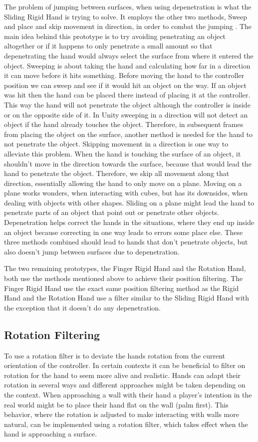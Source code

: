 The problem of jumping between surfaces, when using depenetration is what the Sliding Rigid Hand is trying to solve. It employs the other two methods, Sweep and place and skip movement in direction, in order to combat the jumping . The main idea behind this prototype is to try avoiding penetrating an object altogether or if it happens to only penetrate a small amount so that depenetrating the hand would always select the surface from where it entered the object. Sweeping is about taking the hand and calculating how far in a direction it can move before it hits something. Before moving the hand to the controller position we can sweep and see if it would hit an object on the way. If an object was hit then the hand can be placed there instead of placing it at the controller. This way the hand will not penetrate the object although the controller is inside or on the opposite side of it. In Unity sweeping in a direction will not detect an object if the hand already touches the object. Therefore, in subsequent frames from placing the object on the surface, another method is needed for the hand to not penetrate the object. Skipping movement in a direction is one way to alleviate this problem. When the hand is touching the surface of an object, it shouldn't move in the direction towards the surface, because that would lead the hand to penetrate the object. Therefore, we skip all movement along that direction, essentially allowing the hand to only move on a plane. Moving on a plane works wonders, when interacting with cubes, but has its downsides, when dealing with objects with other shapes. Sliding on a plane might lead the hand to penetrate parts of an object that point out or penetrate other objects. Depenetration helps correct the hands in the situations, where they end up inside an object because correcting in one way leads to errors some place else. These three methods combined should lead to hands that don't penetrate objects, but also doesn't jump between surfaces due to depenetration.

The two remaining prototypes, the Finger Rigid Hand and the Rotation Hand, both use the methods mentioned above to achieve their position filtering. The Finger Rigid Hand use the exact same position filtering method as the Rigid Hand and the Rotation Hand use a filter similar to the Sliding Rigid Hand with the exception that it doesn't do any depenetration.

\subsection{Rotation Filtering}
\label{subsec:categoryRotationFiltering}
To use a rotation filter is to deviate the hands rotation from the current orientation of the controller. In certain contexts it can be beneficial to filter on rotation for the hand to seem more alive and realistic. Hands can adapt their rotation in several ways and different approaches might be taken depending on the context. When approaching a wall with their hand a player's intention in the real world might be to place their hand flat on the wall (palm first). This behavior, where the rotation is adjusted to make interacting with walls more natural, can be implemented using a rotation filter, which takes effect when the hand is approaching a surface.

